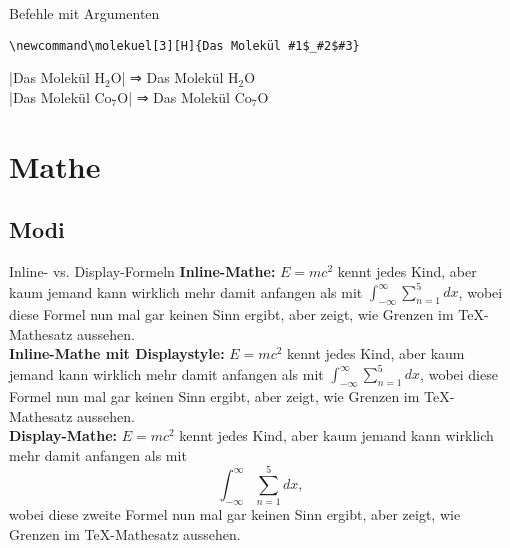 \documentclass[
	vorläufig=false,
	datum=2018-10-29,
	titel={Mathematiksatz I},
	web=false,
	max,
	aspectratio=1610,
]{../tex/latexkurs-slides}
\begin{document}
\begin{frame}[fragile]{Befehle mit Argumenten}
\begin{lstlisting}
\newcommand\molekuel[3][H]{Das Molekül #1$_#2$#3}
\end{lstlisting}
\newcommand\molekuel[3][H]{Das Molekül #1$_#2$#3}
|\molekuel{2}{O}| ⇒ \molekuel{2}{O}\\
|\molekuel[Co]{7}{O}| ⇒ \molekuel[Co]{7}{O}\\
\end{frame}


\section{Mathe}
\subsection{Modi}


\begin{frame}{Inline- vs. Display-Formeln}
\rmfamily
\textbf{Inline-Mathe:} \(E=mc^2\) kennt jedes Kind, aber kaum jemand kann wirklich mehr damit anfangen als mit \(\int^\infty_{-\infty}\sum_{n = 1}^5 dx\), wobei diese Formel nun mal gar keinen Sinn ergibt, aber zeigt, wie Grenzen im \TeX-Mathesatz aussehen.\\
\textbf{Inline-Mathe mit Displaystyle:} \(E=mc^2\) kennt jedes Kind, aber kaum jemand kann wirklich mehr damit anfangen als mit \(\displaystyle \int^\infty_{-\infty}\sum_{n = 1}^5 dx\), wobei diese Formel nun mal gar keinen Sinn ergibt, aber zeigt, wie Grenzen im \TeX-Mathesatz aussehen.\\
\textbf{Display-Mathe:} \(E=mc^2\) kennt jedes Kind, aber kaum jemand kann wirklich mehr damit anfangen als mit \[\int^\infty_{-\infty}\sum_{n = 1}^5 dx,\] wobei diese zweite Formel nun mal gar keinen Sinn ergibt, aber zeigt, wie Grenzen im \TeX-Mathesatz aussehen.
\end{frame}
\end{document}
